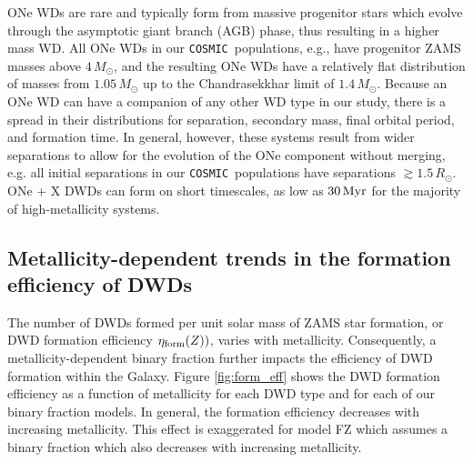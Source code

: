 \documentclass[twocolumn]{aastex631}
\newcommand{\cosmic}{\texttt{COSMIC}}
\begin{document}
ONe WDs are rare and typically form from massive progenitor stars which evolve through the asymptotic giant branch (AGB) phase, thus resulting in a higher mass WD. All ONe WDs in our \cosmic\ populations, e.g., have progenitor ZAMS masses above $4\,M_\odot$, and the resulting ONe WDs have a relatively flat distribution of masses from $1.05\,M_\odot$ up to the Chandrasekkhar limit of $1.4\,M_\odot$. Because an ONe WD can have a companion of any other WD type in our study, there is a spread in their distributions for separation, secondary mass, final orbital period, and formation time. In general, however, these systems result from wider separations to allow for the evolution of the ONe component without merging, e.g. all initial separations in our \cosmic \ populations have separations $\gtrsim 1.5\,R_\odot$. ONe + X DWDs can form on short timescales, as low as $30\,\rm{Myr}$ for the majority of high-metallicity systems. 



\subsection{Metallicity-dependent trends in the formation efficiency of DWDs}\label{sec:formeff}
The number of DWDs formed per unit solar mass of ZAMS star formation, or DWD formation efficiency $\eta_{\rm{form}}(Z))$, varies with metallicity. Consequently, a metallicity-dependent binary fraction further impacts the efficiency of DWD formation within the Galaxy. Figure \ref{fig:form_eff} shows the DWD formation efficiency as a function of metallicity for each DWD type and for each of our binary fraction models. In general, the formation efficiency decreases with increasing metallicity. This effect is exaggerated for model FZ which assumes a binary fraction which also decreases with increasing metallicity. 

\end{document}
